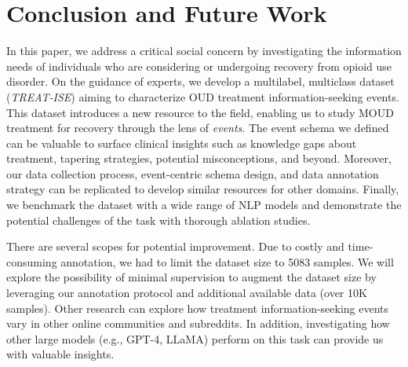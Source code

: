 \documentclass[letterpaper]{article} %
\begin{document}
\section{Conclusion and Future Work}
In this paper, we address a critical social concern by investigating the information needs of individuals who are considering or undergoing recovery from opioid use disorder. On the guidance of experts, we develop a multilabel, multiclass dataset (\textit{TREAT-ISE}) aiming to characterize OUD treatment information-seeking events. This dataset introduces a new resource to the field, enabling us to study MOUD treatment for recovery through the lens of \textit{events}. The event schema we defined can be valuable to surface clinical insights such as knowledge gaps about treatment, tapering strategies, potential misconceptions, and beyond. Moreover, our data collection process, event-centric schema design, and data annotation strategy can be replicated to develop similar resources for other domains. Finally, we benchmark the dataset with a wide range of NLP models and demonstrate the potential challenges of the task with thorough ablation studies. 

There are several scopes for potential improvement. 
Due to costly and time-consuming annotation, we had to limit the dataset size to 5083 samples. We will explore the possibility of minimal supervision to augment the dataset size by leveraging our annotation protocol and additional available data (over 10K samples). Other research can explore how treatment information-seeking events vary in other online communities and subreddits. In addition, investigating how other large models (e.g., GPT-4, LLaMA) perform on this task can provide us with valuable insights. 
\end{document}
